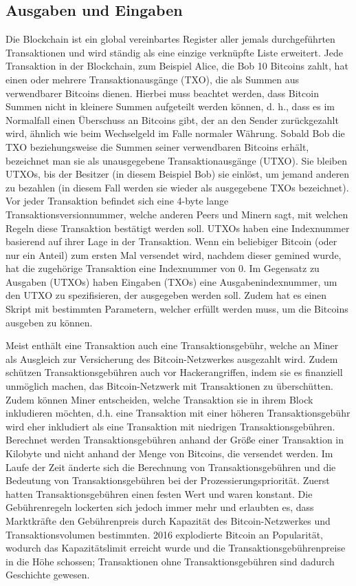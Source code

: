 \subsection{Ausgaben und Eingaben}
Die Blockchain ist ein global vereinbartes Register aller jemals durchgeführten Transaktionen und wird ständig als eine einzige 
verknüpfte Liste erweitert. Jede Transaktion in der Blockchain, zum Beispiel Alice, die Bob 10 Bitcoins zahlt, hat einen oder
mehrere Transaktionausgänge (TXO), die als Summen aus verwendbarer Bitcoins dienen. Hierbei muss beachtet werden, dass Bitcoin
Summen nicht in kleinere Summen aufgeteilt werden können, d. h., dass es im Normalfall einen Überschuss an Bitcoins gibt, der an 
den Sender zurückgezahlt wird, ähnlich wie beim Wechselgeld im Falle normaler Währung. Sobald Bob die TXO beziehungsweise 
die Summen seiner verwendbaren Bitcoins erhält, bezeichnet man sie als unausgegebene Transaktionausgänge (UTXO). Sie bleiben
UTXOs, bis der Besitzer (in diesem Beispiel Bob) sie einlöst, um jemand anderen zu bezahlen (in diesem Fall werden sie wieder
als ausgegebene TXOs bezeichnet).  Vor jeder Transaktion befindet sich eine 4-byte lange
Transaktionsversionnummer, welche anderen Peers und Minern sagt, mit welchen Regeln diese Transaktion bestätigt werden soll.
UTXOs haben eine Indexnummer basierend auf ihrer Lage in der Transaktion. Wenn ein beliebiger Bitcoin (oder nur ein Anteil)
zum ersten Mal versendet wird, nachdem dieser gemined wurde, hat die zugehörige Transaktion eine Indexnummer von 0. Im Gegensatz
zu Ausgaben (UTXOs) haben Eingaben (TXOs) eine Ausgabenindexnummer, um den UTXO zu spezifisieren, der ausgegeben werden soll.
Zudem hat es einen Skript mit bestimmten Parametern, welcher erfüllt werden muss, um die Bitcoins ausgeben zu können.

Meist enthält eine Transaktion auch eine Transaktionsgebühr, welche an Miner als Ausgleich zur Versicherung des Bitcoin-Netzwerkes
ausgezahlt wird. Zudem schützen Transaktionsgebühren auch vor Hackerangriffen, indem sie es finanziell unmöglich machen, das 
Bitcoin-Netzwerk mit Transaktionen zu überschütten. Zudem können Miner entscheiden, welche Transaktion sie in ihrem Block
inkludieren möchten, d.h. eine Transaktion mit einer höheren Transaktionsgebühr wird eher inkludiert als eine Transaktion mit
niedrigen Transaktionsgebühren. Berechnet werden Transaktionsgebühren anhand der Größe einer Transaktion in Kilobyte und nicht 
anhand der Menge von Bitcoins, die versendet werden. Im Laufe der Zeit änderte sich die Berechnung von Transaktionsgebühren
und die Bedeutung von Transaktionsgebühren bei der Prozessierungspriorität. Zuerst hatten Transaktionsgebühren einen festen 
Wert und waren konstant. Die Gebührenregeln lockerten sich jedoch immer mehr und erlaubten es, dass Marktkräfte den
Gebührenpreis durch Kapazität des Bitcoin-Netzwerkes und Transaktionsvolumen bestimmten. 2016 explodierte Bitcoin an Popularität,
wodurch das Kapazitätslimit erreicht wurde und die Transaktionsgebührenpreise in die Höhe schossen; Transaktionen ohne
Transaktionsgebühren sind dadurch Geschichte gewesen. 

